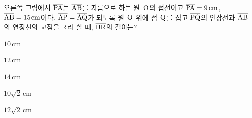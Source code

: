 \noindent\begin{minipage}[t]{0.58\linewidth}\vspace{0pt}\raggedright 오른쪽 그림에서 $\overline{\mathrm{PA}}$는 $\overline{\mathrm{AB}}$를 지름으로 하는 원~$\mathrm{O}$의 접선이고 $\overline{\mathrm{PA}}=9\,\mathrm{cm}$, $\overline{\mathrm{AB}}=15\,\mathrm{cm}$이다. $\overline{\mathrm{AP}}=\overline{\mathrm{AQ}}$가 되도록 원~$\mathrm{O}$ 위에 점~$\mathrm{Q}$를 잡고 $\overline{\mathrm{PQ}}$의 연장선과 $\overline{\mathrm{AB}}$의 연장선의 교점을 $\mathrm{R}$라 할 때, $\overline{\mathrm{BR}}$의 길이는?\end{minipage}\hfill\begin{minipage}[t]{0.4\linewidth}\vspace{0pt}\centering \resizebox{\ifdim\width>\linewidth\linewidth\else\width\fi}{!}{}\end{minipage}\par
\begin{choices32}{\rule[-3ex]{0pt}{8ex}$10\,\mathrm{cm}$}{\rule[-3ex]{0pt}{8ex}$12\,\mathrm{cm}$}{\rule[-3ex]{0pt}{8ex}$14\,\mathrm{cm}$}{\rule[-3ex]{0pt}{8ex}$10\sqrt{2}\,\mathrm{cm}$}{\rule[-3ex]{0pt}{8ex}$12\sqrt{2}\,\mathrm{cm}$}\end{choices32}
